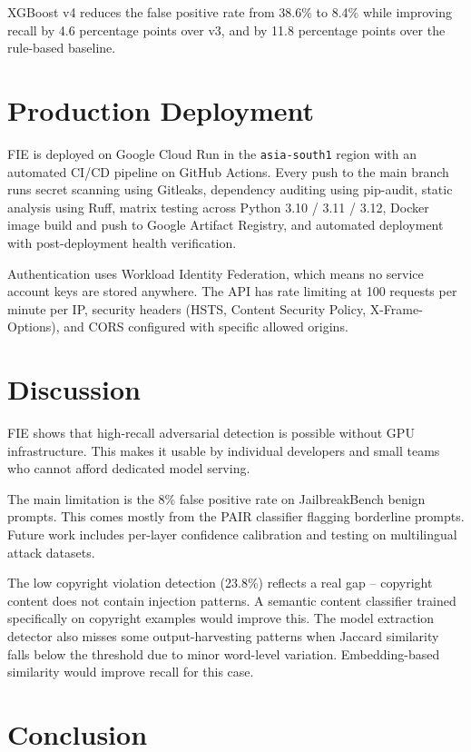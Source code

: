 \documentclass[12pt,a4paper]{article}
\begin{document}
XGBoost v4 reduces the false positive rate from 38.6\% to 8.4\% while
improving recall by 4.6 percentage points over v3, and by 11.8 percentage
points over the rule-based baseline.

\section{Production Deployment}

FIE is deployed on Google Cloud Run in the \texttt{asia-south1} region with
an automated CI/CD pipeline on GitHub Actions. Every push to the main branch
runs secret scanning using Gitleaks, dependency auditing using pip-audit,
static analysis using Ruff, matrix testing across Python 3.10 / 3.11 / 3.12,
Docker image build and push to Google Artifact Registry, and automated
deployment with post-deployment health verification.

Authentication uses Workload Identity Federation, which means no service
account keys are stored anywhere. The API has rate limiting at 100 requests
per minute per IP, security headers (HSTS, Content Security Policy,
X-Frame-Options), and CORS configured with specific allowed origins.

\section{Discussion}

FIE shows that high-recall adversarial detection is possible without GPU
infrastructure. This makes it usable by individual developers and small teams
who cannot afford dedicated model serving.

The main limitation is the 8\% false positive rate on JailbreakBench benign
prompts. This comes mostly from the PAIR classifier flagging borderline prompts.
Future work includes per-layer confidence calibration and testing on multilingual
attack datasets.

The low copyright violation detection (23.8\%) reflects a real gap -- copyright
content does not contain injection patterns. A semantic content classifier
trained specifically on copyright examples would improve this. The model
extraction detector also misses some output-harvesting patterns when Jaccard
similarity falls below the threshold due to minor word-level variation.
Embedding-based similarity would improve recall for this case.

\section{Conclusion}
\end{document}
